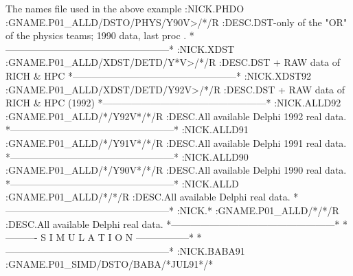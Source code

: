 \begin{XMPt}{The names file used in the above example}
:NICK.PHDO                                                              
:GNAME.P01_ALLD/DSTO/PHYS/Y90V>/*/R                                     
:DESC.DST-only of the "OR" of the physics teams; 1990 data, last proc . 
*---------------------------------------------------*                   
:NICK.XDST                                                              
:GNAME.P01_ALLD/XDST/DETD/Y*V>/*/R                                      
:DESC.DST + RAW data of RICH & HPC                                      
*---------------------------------------------------*                   
:NICK.XDST92                                                            
:GNAME.P01_ALLD/XDST/DETD/Y92V>/*/R                                     
:DESC.DST + RAW data of RICH & HPC  (1992)                              
*---------------------------------------------------*                   
:NICK.ALLD92                                                            
:GNAME.P01_ALLD/*/Y92V*/*/R                                             
:DESC.All available Delphi 1992 real data.                              
*---------------------------------------------------*                   
:NICK.ALLD91                                                            
:GNAME.P01_ALLD/*/Y91V*/*/R                                             
:DESC.All available Delphi 1991 real data.                              
*---------------------------------------------------*                   
:NICK.ALLD90                                                            
:GNAME.P01_ALLD/*/Y90V*/*/R                                             
:DESC.All available Delphi 1990 real data.                              
*---------------------------------------------------*                   
:NICK.ALLD                                                              
:GNAME.P01_ALLD/*/*/R                                                   
:DESC.All available Delphi real data.                                   
*---------------------------------------------------*                   
:NICK.*                                                                 
:GNAME.P01_ALLD/*/*/R                                                   
:DESC.All available Delphi real data.                                   
*---------------------------------------------------*                   
*----------   S I M U L A T I O N  -----------------*                   
*---------------------------------------------------*                   
:NICK.BABA91                                                            
:GNAME.P01_SIMD/DSTO/BABA/*JUL91*/*                                     

\end{XMPt}

